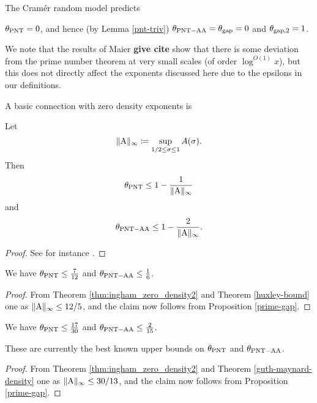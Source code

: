 The Cram\'er random model \cite{cramer} predicts

\begin{conjecture} $\theta_{\mathrm{PNT}} = 0$, and hence (by Lemma \ref{pnt-triv}) $\theta_{\mathrm{PNT-AA}} = \theta_{\mathrm{gap}}=0$ and $\theta_{\mathrm{gap},2}=1$.
\end{conjecture}

We note that the results of Maier {\bf give cite} show that there is some deviation from the prime number theorem at very small scales (of order $\log^{O(1)} x$), but this does not directly affect the exponents discussed here due to the epsilons in our definitions.

A basic connection with zero density exponents is

\begin{proposition}\label{prime-gap}  Let
\begin{equation}\label{A-def}
    \|\mathrm{A}\|_\infty \coloneqq \sup_{1/2 \leq \sigma \leq 1} A(\sigma).
\end{equation}
Then
    $$ \theta_{\mathrm{PNT}} \leq 1 - \frac{1}{\|\mathrm{A}\|_\infty}$$
    and
    $$ \theta_{\mathrm{PNT-AA}} \leq 1 - \frac{2}{\|\mathrm{A}\|_\infty}.$$
\end{proposition}

\begin{proof} See for instance \cite[\S 13.2]{guth-maynard}.
\end{proof}

\begin{corollary}  We have $\theta_{\mathrm{PNT}} \leq \frac{7}{12}$ and $\theta_{\mathrm{PNT-AA}} \leq \frac{1}{6}$.
\end{corollary}

\begin{proof}  From Theorem \ref{thm:ingham_zero_density2} and Theorem \ref{huxley-bound} one as $\|\mathrm{A}\|_\infty \leq 12/5$, and the claim now follows from Proposition \ref{prime-gap}.
\end{proof}

\begin{corollary}\cite{guth-maynard}  We have $\theta_{\mathrm{PNT}} \leq \frac{17}{30}$ and $\theta_{\mathrm{PNT-AA}} \leq \frac{2}{15}$.
\end{corollary}

These are currently the best known upper bounds on $\theta_{\mathrm{PNT}}$ and $\theta_{\mathrm{PNT-AA}}$.

\begin{proof}  From Theorem \ref{thm:ingham_zero_density2} and Theorem \ref{guth-maynard-density} one as $\|\mathrm{A}\|_\infty \leq 30/13$, and the claim now follows from Proposition \ref{prime-gap}.
\end{proof}


